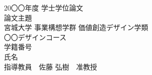\begin{titlepage}
  \begin{center}
    {\large 20〇〇年度 学士学位論文}\\ %
    \vspace{19\zh}
    {\Huge 論文主題}\\ %
    \vspace{22\zh}
    \large{
      宮城大学 事業構想学群 価値創造デザイン学類\\
      〇〇デザインコース\\
      \vspace{1\zh}
      学籍番号\\
      氏名\\
      \vspace{3\zh}
      指導教員　佐藤 弘樹　准教授
    }
  \end{center}
\end{titlepage}
